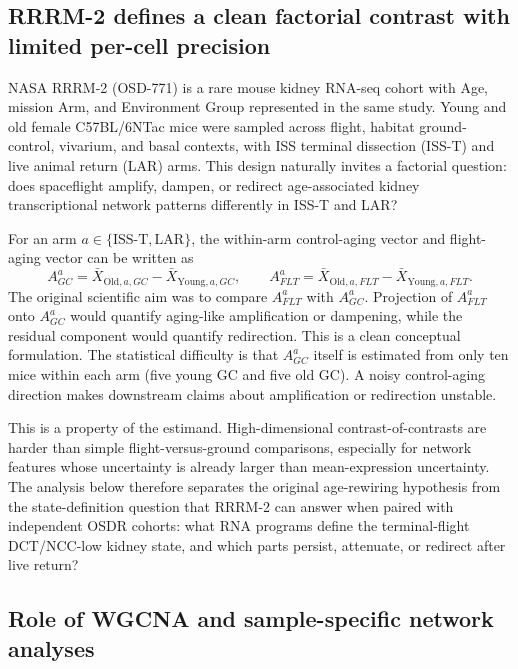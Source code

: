 \documentclass[11pt]{article}
\begin{document}
\subsection{RRRM-2 defines a clean factorial contrast with limited per-cell precision}

NASA RRRM-2 (OSD-771) is a rare mouse kidney RNA-seq cohort with Age, mission Arm, and Environment Group represented in the same study. Young and old female C57BL/6NTac mice were sampled across flight, habitat ground-control, vivarium, and basal contexts, with ISS terminal dissection (ISS-T) and live animal return (LAR) arms. This design naturally invites a factorial question: does spaceflight amplify, dampen, or redirect age-associated kidney transcriptional network patterns differently in ISS-T and LAR?

For an arm $a\in\{\mathrm{ISS\mbox{-}T},\mathrm{LAR}\}$, the within-arm control-aging vector and flight-aging vector can be written as
\begin{equation}
A^a_{GC}=\bar{X}_{\mathrm{Old},a,GC}-\bar{X}_{\mathrm{Young},a,GC},
\qquad
A^a_{FLT}=\bar{X}_{\mathrm{Old},a,FLT}-\bar{X}_{\mathrm{Young},a,FLT}.
\end{equation}
The original scientific aim was to compare $A^a_{FLT}$ with $A^a_{GC}$. Projection of $A^a_{FLT}$ onto $A^a_{GC}$ would quantify aging-like amplification or dampening, while the residual component would quantify redirection. This is a clean conceptual formulation. The statistical difficulty is that $A^a_{GC}$ itself is estimated from only ten mice within each arm (five young GC and five old GC). A noisy control-aging direction makes downstream claims about amplification or redirection unstable.

This is a property of the estimand. High-dimensional contrast-of-contrasts are harder than simple flight-versus-ground comparisons, especially for network features whose uncertainty is already larger than mean-expression uncertainty. The analysis below therefore separates the original age-rewiring hypothesis from the state-definition question that RRRM-2 can answer when paired with independent OSDR cohorts: what RNA programs define the terminal-flight DCT/NCC-low kidney state, and which parts persist, attenuate, or redirect after live return?

\subsection{Role of WGCNA and sample-specific network analyses}
\end{document}
